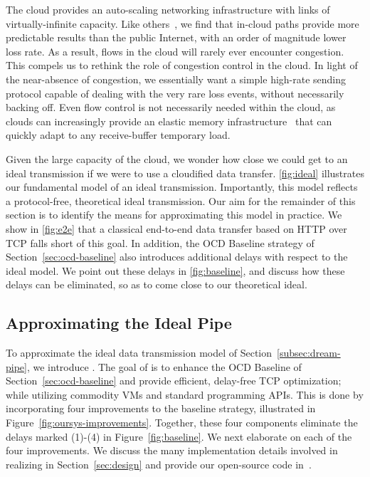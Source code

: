  The cloud provides an auto-scaling networking infrastructure with links of virtually-infinite capacity. Like others~\cite{haq2017measuring}, we find that in-cloud paths provide more predictable results than the public Internet, with an order of magnitude lower loss rate. As a result, flows in the cloud will rarely ever encounter congestion. This compels us to rethink the role of congestion control in the cloud. In light of the near-absence of congestion, we essentially want a simple high-rate sending protocol capable of dealing with the very rare loss events, without necessarily backing off. Even flow control is not necessarily needed within the cloud, as clouds can increasingly provide an elastic memory infrastructure~\cite{hotadd,baloon} that can quickly adapt to any receive-buffer temporary load. 

 Given the large capacity of the cloud, we wonder how close we could get to an ideal transmission if we were to use a cloudified data transfer.
\autoref{fig:ideal} illustrates our fundamental model of an ideal transmission. Importantly, this model reflects a protocol-free, theoretical ideal transmission. Our aim for the remainder of this section is to identify the means for approximating this model in practice. We show in \autoref{fig:e2e} that a classical end-to-end data transfer based on HTTP over TCP falls short 
of this goal. In addition, the OCD Baseline strategy of Section~\ref{sec:ocd-baseline} also introduces additional delays with respect to the ideal model. We point out these delays in \autoref{fig:baseline}, and discuss how these delays can be eliminated, so as to come close to our theoretical ideal.


\subsection{Approximating the Ideal Pipe}\label{sec:approx}

To approximate the ideal data transmission model of Section~\ref{subsec:dream-pipe}, we introduce \textit{\oursys}.
The goal of \oursys is to enhance the OCD Baseline of Section~\ref{sec:ocd-baseline} and provide efficient, delay-free TCP optimization; while utilizing commodity VMs and standard programming APIs. This is done by incorporating four improvements to the baseline strategy, illustrated in Figure~\ref{fig:oursys-improvements}. Together, these four components eliminate the delays marked (1)-(4) in Figure~\ref{fig:baseline}. We next elaborate on each of the four improvements. We discuss the many implementation details involved in realizing \oursys in Section~\ref{sec:design} and provide our open-source code in~\cite{ktcp}.

